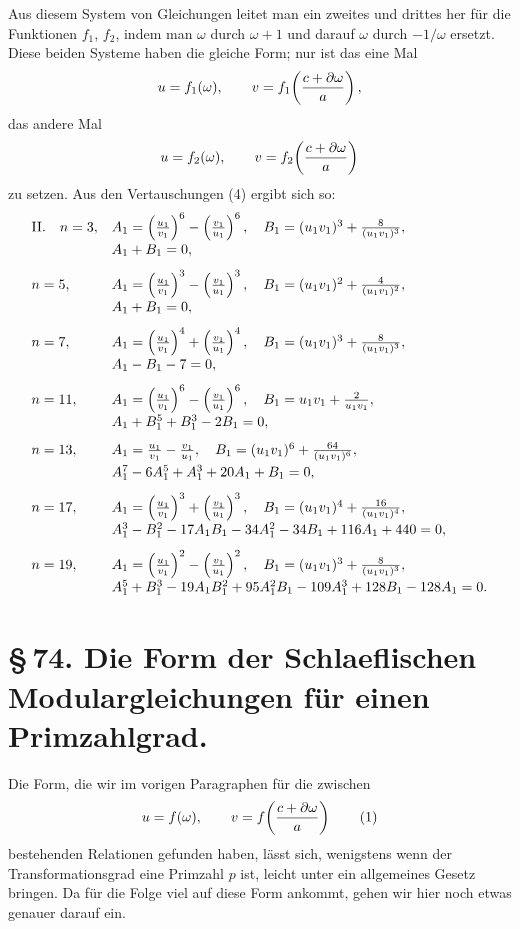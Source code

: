 \documentclass[11pt]{article}
\begin{document}
Aus diesem System von Gleichungen leitet man ein zweites und drittes her für die Funktionen $f_1$, $f_2$, indem man $\omega$ durch $\omega+1$ und darauf $\omega$ durch $-1/\omega$ ersetzt. Diese beiden Systeme haben die gleiche Form; nur ist das eine Mal
\[
 u=f_1(\omega),\qquad v=f_1\!\left({c+\partial\omega\over a}\right),
\]
das andere Mal
\[
 u=f_2(\omega),\qquad v=f_2\!\left({c+\partial\omega\over a}\right)
\]
zu setzen. Aus den Vertauschungen (4) ergibt sich so:
\[
\begin{array}{ll}
\mathrm{II.}\quad n=3,&
 A_1=\left({u_1\over v_1}\right)^6-\left({v_1\over u_1}\right)^6,
 \quad B_1=(u_1v_1)^3+{8\over(u_1v_1)^3},\\[0.4em]
& A_1+B_1=0,\\[0.8em]
 n=5,&
 A_1=\left({u_1\over v_1}\right)^3-\left({v_1\over u_1}\right)^3,
 \quad B_1=(u_1v_1)^2+{4\over(u_1v_1)^2},\\[0.4em]
& A_1+B_1=0,\\[0.8em]
 n=7,&
 A_1=\left({u_1\over v_1}\right)^4+\left({v_1\over u_1}\right)^4,
 \quad B_1=(u_1v_1)^3+{8\over(u_1v_1)^3},\\[0.4em]
& A_1-B_1-7=0,\\[0.8em]
 n=11,&
 A_1=\left({u_1\over v_1}\right)^6-\left({v_1\over u_1}\right)^6,
 \quad B_1=u_1v_1+{2\over u_1v_1},\\[0.4em]
& A_1+B_1^5+B_1^3-2B_1=0,\\[0.8em]
 n=13,&
 A_1={u_1\over v_1}-{v_1\over u_1},
 \quad B_1=(u_1v_1)^6+{64\over(u_1v_1)^6},\\[0.4em]
& A_1^7-6A_1^5+A_1^3+20A_1+B_1=0,\\[0.8em]
 n=17,&
 A_1=\left({u_1\over v_1}\right)^3+\left({v_1\over u_1}\right)^3,
 \quad B_1=(u_1v_1)^4+{16\over(u_1v_1)^4},\\[0.4em]
& A_1^3-B_1^2-17A_1B_1-34A_1^2-34B_1+116A_1+440=0,\\[0.8em]
 n=19,&
 A_1=\left({u_1\over v_1}\right)^2-\left({v_1\over u_1}\right)^2,
 \quad B_1=(u_1v_1)^3+{8\over(u_1v_1)^3},\\[0.4em]
& A_1^5+B_1^3-19A_1B_1^2+95A_1^2B_1-109A_1^3+128B_1-128A_1=0.
\end{array}
\]

\section*{\S\,74. Die Form der Schlaeflischen Modulargleichungen für einen Primzahlgrad.}

Die Form, die wir im vorigen Paragraphen für die zwischen
\begin{equation}
 u=f(\omega),\qquad v=f\!\left({c+\partial\omega\over a}\right)
\tag{1}
\end{equation}
bestehenden Relationen gefunden haben, lässt sich, wenigstens wenn der Transformationsgrad eine Primzahl $p$ ist, leicht unter ein allgemeines Gesetz bringen. Da für die Folge viel auf diese Form ankommt, gehen wir hier noch etwas genauer darauf ein.
\end{document}
